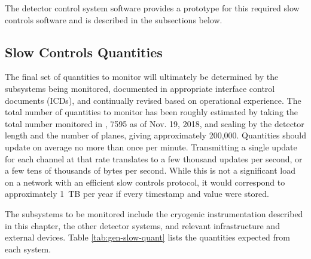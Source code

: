The  detector control system software \cite{pdspdcs_proc}
provides a prototype for this required  slow
controls software and is described in the subsections  below.

\subsection{Slow Controls Quantities}
\label{sec:fdgen-slow-cryo-quant}


The final set of quantities to monitor will ultimately be determined
by the subsystems being monitored, documented in
appropriate  interface control documents (ICDs), and continually revised based on operational
experience.  The total number of quantities to monitor has been roughly estimated by taking the total number monitored
in \cite{pdspdcs_proc}, 7595 as of Nov. 19, 2018, and scaling by the detector length and the number of planes, giving approximately 200,000. %
Quantities should update on average no more than once per minute.
Transmitting a single update for each channel at that rate translates to a few thousand updates per second, or a few tens of thousands of bytes per second. While this is not a significant load on a network with an efficient slow controls protocol, it would correspond to approximately 1~TB per year if every timestamp and value were stored.

The subsystems
to be monitored include the %
cryogenic instrumentation
described in this chapter, the other detector systems, and relevant
infrastructure and external devices. Table \ref{tab:gen-slow-quant}
lists the quantities expected from each system.

